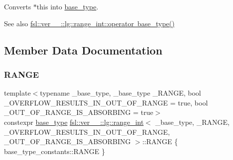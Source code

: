 Converts $\ast$this into \mbox{\hyperlink{classfsl_1_1ver__1__0_1_1lg_1_1range__int_aa6c763f6d72d18c8b9129c0c06628cd3}{base\+\_\+type}}. 

\begin{DoxySeeAlso}{See also}
\mbox{\hyperlink{classfsl_1_1ver__1__0_1_1lg_1_1range__int_a0b4a2f845550553abc83cbe4c6203403}{fsl\+::ver\+\_\+\_\+::lg\+::range\+\_\+int\+::operator base\+\_\+type()}} 
\end{DoxySeeAlso}


\subsection{Member Data Documentation}
\mbox{\label{classfsl_1_1ver__1__0_1_1lg_1_1range__int_ae1914aaa2b3bdfc26a9dfd71c73efffd}} 
\subsubsection{\texorpdfstring{RANGE}{RANGE}}
{\footnotesize\ttfamily template$<$typename \+\_\+base\+\_\+type, \+\_\+base\+\_\+type \+\_\+\+R\+A\+N\+GE, bool \+\_\+\+O\+V\+E\+R\+F\+L\+O\+W\+\_\+\+R\+E\+S\+U\+L\+T\+S\+\_\+\+I\+N\+\_\+\+O\+U\+T\+\_\+\+O\+F\+\_\+\+R\+A\+N\+GE = true, bool \+\_\+\+O\+U\+T\+\_\+\+O\+F\+\_\+\+R\+A\+N\+G\+E\+\_\+\+I\+S\+\_\+\+A\+B\+S\+O\+R\+B\+I\+NG = true$>$ \\
constexpr \mbox{\hyperlink{classfsl_1_1ver__1__0_1_1lg_1_1range__int_aa6c763f6d72d18c8b9129c0c06628cd3}{base\+\_\+type}} \mbox{\hyperlink{classfsl_1_1ver__1__0_1_1lg_1_1range__int}{fsl\+::ver\+\_\+\_\+::lg\+::range\+\_\+int}}$<$ \+\_\+base\+\_\+type, \+\_\+\+R\+A\+N\+GE, \+\_\+\+O\+V\+E\+R\+F\+L\+O\+W\+\_\+\+R\+E\+S\+U\+L\+T\+S\+\_\+\+I\+N\+\_\+\+O\+U\+T\+\_\+\+O\+F\+\_\+\+R\+A\+N\+GE, \+\_\+\+O\+U\+T\+\_\+\+O\+F\+\_\+\+R\+A\+N\+G\+E\+\_\+\+I\+S\+\_\+\+A\+B\+S\+O\+R\+B\+I\+NG $>$\+::R\+A\+N\+GE \{ base\+\_\+type\+\_\+constants\+::\+R\+A\+N\+GE \}\hspace{0.3cm}{\ttfamily [static]}}




